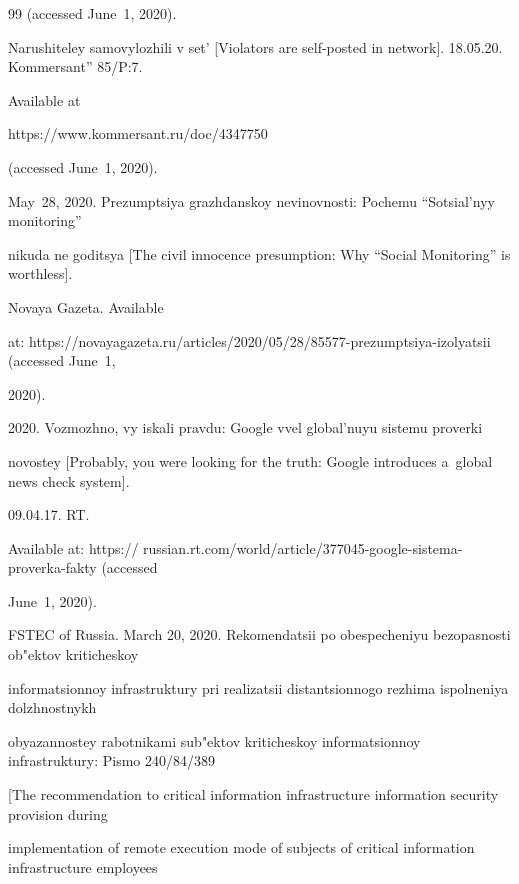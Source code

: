 {{\begin{thebibliography}{99}
(accessed June~1, 2020).




Narushiteley samovylozhili v set' [Violators are self-posted in network]. 18.05.20. Kommersant'' 85/P:7.


Available at {\sf 


https://www.kommersant.ru/doc/4347750} (accessed June~1, 2020). 







 May~28, 2020. Prezumptsiya grazhdanskoy nevinovnosti: Po\-che\-mu ``Sotsial'nyy monitoring'' 


nikuda ne goditsya [The civil innocence presumption: Why ``Social Monitoring'' is worthless]. 


Novaya Gazeta. Available 


at: {\sf https://novayagazeta.ru/articles/2020/05/28/85577-prezumptsiya-izolyatsii} (accessed June~1, 


2020).







 2020. Vozmozhno, vy iskali pravdu: Google vvel global'nuyu sistemu proverki 


novostey [Probably, you were looking for the truth: Google introduces a~global news check system]. 


09.04.17. RT.


Available at: {\sf  https:// russian.rt.com/world/article/377045-google-sistema-proverka-fakty} (accessed 


June~1, 2020).







FSTEC of Russia. March 20, 2020. Rekomendatsii po obespecheniyu bezopasnosti ob"ektov kriticheskoy 


informatsionnoy infrastruktury pri realizatsii distantsionnogo rezhima ispolneniya dolzhnostnykh 


obyazannostey rabotnikami sub"ektov kriticheskoy informatsionnoy infrastruktury: Pismo 240/84/389 


[The recommendation to critical information infrastructure information security provision  during 


implementation of remote execution mode of subjects of critical information infrastructure employees 



\end{thebibliography}}}
